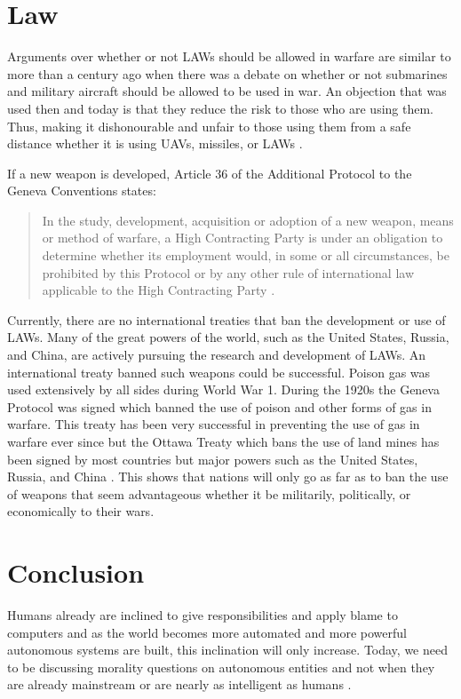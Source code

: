 \documentclass[journal]{IEEEtran}
\begin{document}
\section{Law}
Arguments over whether or not LAWs should be allowed in warfare are similar to more than a century ago when there was a debate on whether or not submarines and military aircraft should be allowed to be used in war. An objection that was used then and today is that they reduce the risk to those who are using them. Thus, making it dishonourable and unfair to those using them from a safe distance whether it is using UAVs, missiles, or LAWs \cite{anderson2013law}.

If a new weapon is developed, Article 36 of the Additional Protocol to the Geneva Conventions states:
\begin{quote}
	In the study, development, acquisition or adoption of a new weapon, means or method of warfare, a High Contracting Party is under an obligation to determine whether its employment would, in some or all circumstances, be prohibited by this Protocol or by any other rule of international law applicable to the High Contracting Party \cite{anderson2015autonomous}.
\end{quote}
Currently, there are no international treaties that ban the development or use of LAWs. Many of the great powers of the world, such as the United States, Russia, and China, are actively pursuing the research and development of LAWs. An international treaty banned such weapons could be successful. Poison gas was used extensively by all sides during World War 1. During the 1920s the Geneva Protocol was signed which banned the use of poison and other forms of gas in warfare. This treaty has been very successful in preventing the use of gas in warfare ever since but the Ottawa Treaty which bans the use of land mines has been signed by most countries but major powers such as the United States, Russia, and China \cite{umbrello2020future}. This shows that nations will only go as far as to ban the use of weapons that seem advantageous whether it be militarily, politically, or economically to their wars.

\section{Conclusion}
Humans already are inclined to give responsibilities and apply blame to computers and as the world becomes more automated and more powerful autonomous systems are built, this inclination will only increase. Today, we need to be discussing morality questions on autonomous entities and not when they are already mainstream or are nearly as intelligent as humans \cite{Hellstrom2013-HELOTM-2}.
\end{document}
